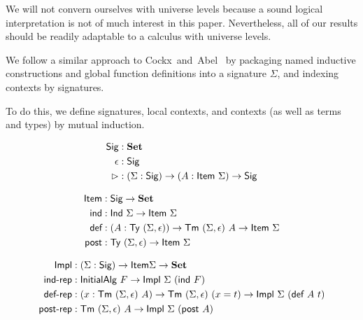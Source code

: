 We will not convern ourselves with universe levels because a sound logical
interpretation is not of much interest in this paper. Nevertheless, all of our
results should be readily adaptable to a calculus with universe levels.

We follow a similar approach to Cockx~and~Abel~\cite{Cockx2018-fk}
by packaging named inductive constructions and global function definitions into
a signature $\Sigma$, and indexing contexts by signatures.

To do this, we define signatures, local contexts, and contexts (as well as terms
and types) by mutual induction.
\begin{figure}[h]
  \begin{minipage}[t]{0.5\textwidth}
  \begin{align*}
  \textsf{Sig} &: \mathbf{Set} \\
  \epsilon &: \textsf{Sig} \\
  \rhd &: (\Sigma : \textsf{Sig}) \to (A : \textsf{Item}\ \Sigma) \to \textsf{Sig}
  \end{align*}
  \end{minipage}
  \begin{minipage}[t]{0.5\textwidth}
  \begin{align*}
  \textsf{Item} &: \textsf{Sig} \to \mathbf{Set} \\
  \textsf{ind} &: \textsf{Ind}\ \Sigma \to \textsf{Item}\ \Sigma \\
  \textsf{def} &: (A : \textsf{Ty}\ (\Sigma, \epsilon)) \to \textsf{Tm}\ (\Sigma, \epsilon)\ A \to \textsf{Item}\ \Sigma \\
  \textsf{post} &: \textsf{Ty}\ (\Sigma, \epsilon) \to \textsf{Item}\ \Sigma \\
  \end{align*}
  \end{minipage}
  \begin{minipage}[t]{0.5\textwidth}
  \begin{align*}
  \Impl &: (\Sigma : \Sig) \to \Item \Sigma \to \Set \\
  \mta{ind-rep} &: \mta{InitialAlg}\ F \to \Impl\ \Sigma\ (\mta{ind}\ F) \\
  \mta{def-rep} &: (x : \Tm\ (\Sigma, \epsilon)\ A) \to \Tm\ (\Sigma, \epsilon)\ (x = t) \to \Impl\ \Sigma\ (\mta{def}\ A\ t) \\
  \mta{post-rep} &: \Tm\ (\Sigma, \epsilon)\ A \to \Impl\ \Sigma\ (\mta{post}\ A) \\
  \end{align*}
  \end{minipage}
  \begin{minipage}[t]{0.5\textwidth}
  \begin{align*}

\end{align*}
\end{minipage}
\end{figure}
